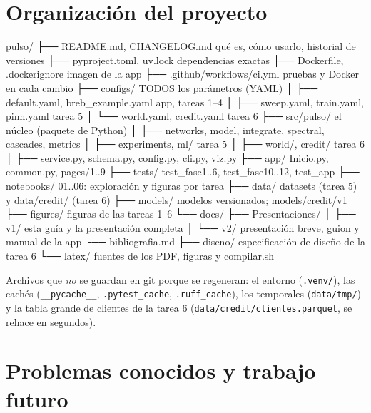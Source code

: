 \chapter{Organización del proyecto}

\begin{codigo}[label=estructura de carpetas]
pulso/
├── README.md, CHANGELOG.md        qué es, cómo usarlo, historial de versiones
├── pyproject.toml, uv.lock        dependencias exactas
├── Dockerfile, .dockerignore      imagen de la app
├── .github/workflows/ci.yml       pruebas y Docker en cada cambio
├── configs/                       TODOS los parámetros (YAML)
│   ├── default.yaml, breb_example.yaml       app, tareas 1–4
│   ├── sweep.yaml, train.yaml, pinn.yaml     tarea 5
│   └── world.yaml, credit.yaml               tarea 6
├── src/pulso/                    el núcleo (paquete de Python)
│   ├── networks, model, integrate, spectral, cascades, metrics
│   ├── experiments, ml/            tarea 5
│   ├── world/, credit/             tarea 6
│   ├── service.py, schema.py, config.py, cli.py, viz.py
├── app/                           Inicio.py, common.py, pages/1..9
├── tests/                         test_fase1..6, test_fase10..12, test_app
├── notebooks/                     01..06: exploración y figuras por tarea
├── data/                          datasets (tarea 5) y data/credit/ (tarea 6)
├── models/                        modelos versionados; models/credit/v1
├── figures/                       figuras de las tareas 1–6
└── docs/
    ├── Presentaciones/
    │   ├── v1/                    esta guía y la presentación completa
    │   └── v2/                    presentación breve, guion y manual de la app
    ├── bibliografia.md
    ├── diseno/                    especificación de diseño de la tarea 6
    └── latex/                     fuentes de los PDF, figuras y compilar.sh
\end{codigo}

Archivos que \emph{no} se guardan en git porque se regeneran: el entorno
(\texttt{.venv/}), las cachés (\texttt{\_\_pycache\_\_}, \texttt{.pytest\_cache},
\texttt{.ruff\_cache}), los temporales (\texttt{data/tmp/}) y la tabla grande de
clientes de la tarea 6 (\texttt{data/credit/clientes.parquet}, se rehace en segundos).

\chapter{Problemas conocidos y trabajo futuro}

